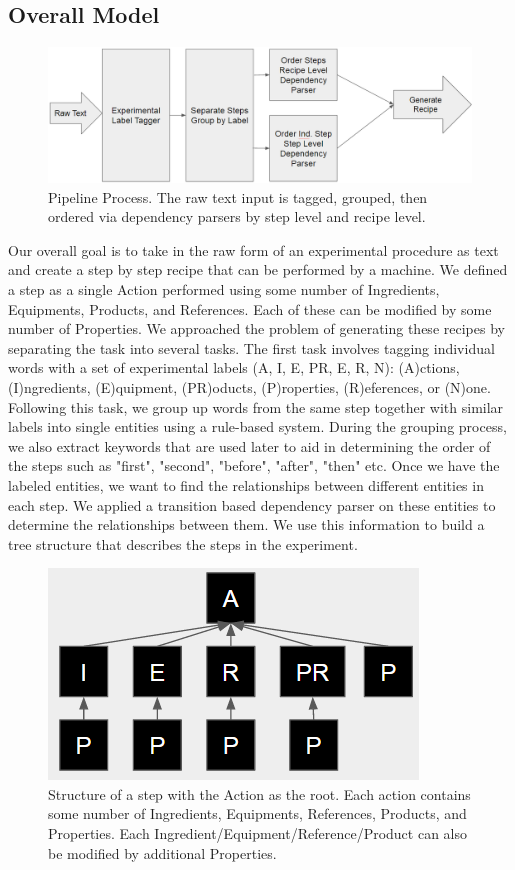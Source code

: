 \subsection{Overall Model}

\begin{figure}
  \centering
    \includegraphics[width=.5\textwidth]{process.png}
  \caption{Pipeline Process. The raw text input is tagged, grouped, then ordered via dependency parsers by step level and recipe level.}
\end{figure}

Our overall goal is to take in the raw form of an experimental procedure as text and create a step by step recipe that can be performed by a machine. We defined a step as a single Action performed using some number of Ingredients, Equipments, Products, and References. Each of these can be modified by some number of Properties. We approached the problem of generating these recipes by separating the task into several tasks. The first task involves tagging individual words with a set of experimental labels (A, I, E, PR, E, R, N):  (A)ctions, (I)ngredients, (E)quipment, (PR)oducts, (P)roperties, (R)eferences, or (N)one. Following this task, we group up words from the same step together with similar labels into single entities using a rule-based system. During the grouping process, we also extract keywords that are used later to aid in determining the order of the steps such as "first", "second", "before", "after", "then" etc. Once we have the labeled entities, we want to find the relationships between different entities in each step. We applied a transition based dependency parser on these entities to determine the relationships between them. We use this information to build a tree structure that describes the steps in the experiment. 

\begin{figure}
  \centering
    \includegraphics[width=.5\textwidth]{recipediag.png}
  \caption{Structure of a step with the Action as the root. Each action contains some number of Ingredients, Equipments, References, Products, and Properties. Each Ingredient/Equipment/Reference/Product can also be modified by additional Properties.}
\end{figure}

